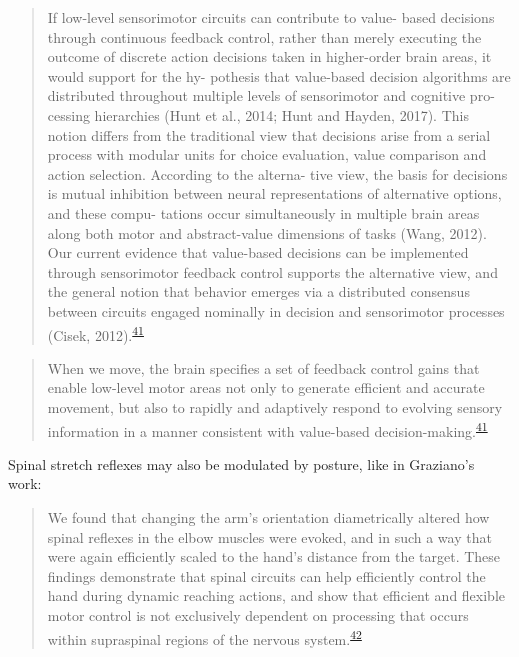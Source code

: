 \documentclass[
  a4paper,
]{article}
\begin{document}
\begin{quote}
If low-level sensorimotor circuits can contribute to value- based
decisions through continuous feedback control, rather than merely
executing the outcome of discrete action decisions taken in higher-order
brain areas, it would support for the hy- pothesis that value-based
decision algorithms are distributed throughout multiple levels of
sensorimotor and cognitive pro- cessing hierarchies (Hunt et al., 2014;
Hunt and Hayden, 2017). This notion differs from the traditional view
that decisions arise from a serial process with modular units for choice
evaluation, value comparison and action selection. According to the
alterna- tive view, the basis for decisions is mutual inhibition between
neural representations of alternative options, and these compu- tations
occur simultaneously in multiple brain areas along both motor and
abstract-value dimensions of tasks (Wang, 2012). Our current evidence
that value-based decisions can be implemented through sensorimotor
feedback control supports the alternative view, and the general notion
that behavior emerges via a distributed consensus between circuits
engaged nominally in decision and sensorimotor processes (Cisek,
2012).\textsuperscript{\protect\hyperlink{ref-carrollRapidVisuomotorResponses2019}{41}}
\end{quote}

\begin{quote}
When we move, the brain specifies a set of feedback control gains that
enable low-level motor areas not only to generate efficient and accurate
movement, but also to rapidly and adaptively respond to evolving sensory
information in a manner consistent with value-based
decision-making.\textsuperscript{\protect\hyperlink{ref-carrollRapidVisuomotorResponses2019}{41}}
\end{quote}

Spinal stretch reflexes may also be modulated by posture, like in
Graziano's work:

\begin{quote}
We found that changing the arm's orientation diametrically altered how
spinal reflexes in the elbow muscles were evoked, and in such a way that
were again efficiently scaled to the hand's distance from the target.
These findings demonstrate that spinal circuits can help efficiently
control the hand during dynamic reaching actions, and show that
efficient and flexible motor control is not exclusively dependent on
processing that occurs within supraspinal regions of the nervous
system.\textsuperscript{\protect\hyperlink{ref-weiler2020}{42}}
\end{quote}
\end{document}
